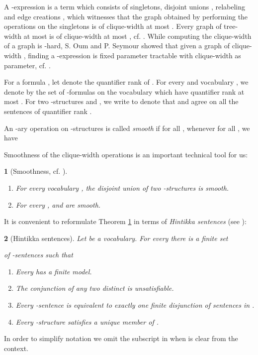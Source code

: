 \documentclass{llncs}
\newtheorem{thm}{\protect\theoremname}
\newtheorem{prop}[thm]{\protect\propositionname}
\providecommand{\propositionname}{Proposition}
\providecommand{\theoremname}{Theorem}
\begin{document}
A -expression is a term  which consists of singletons, disjoint unions , relabeling  and edge creations , which witnesses that the graph  obtained by performing the operations on the singletons is of clique-width at most . Every graph of tree-width at most  is of clique-width at most , cf. \cite{ar:CourcelleOlariu2000}. While computing the clique-width of a graph is -hard, S. Oum and P. Seymour showed that given a graph of clique-width , finding a -expression is fixed parameter tractable with clique-width as parameter, cf. \cite{ar:Oum2005,ar:SeymourOum2006}. 

For a formula , let  denote the quantifier
rank of . For every  and vocabulary ,
we denote by  the set of -formulas on the
vocabulary  which have quantifier rank at most . For two
-structures  and , we write 
to denote that  and  agree on all the
sentences of quantifier rank . 

\begin{definition}
 An -ary operation  on -structures is called {\em smooth} 
if for all , 
whenever   for all , 
we have  
\end{definition}

Smoothness
of the clique-width operations is an important technical tool for
us:
\begin{thm}
[Smoothness, cf. \cite{makowsky2004algorithmic}] \label{th:smooth}~
\begin{enumerate}
\item For every vocabulary , the disjoint union  of two
-structures is smooth. 
\item For every ,  and 
are smooth. 
\end{enumerate}
\end{thm}
It is convenient to reformulate Theorem \ref{th:smooth} in terms
of {\em Hintikka sentences} (see \cite{bk:EF2005}):
\begin{prop}
[Hintikka sentences] \label{prop:Hin}  Let  be a vocabulary.
For every  there is a finite set

 of -sentences such that
\begin{enumerate}
\item Every  has a finite model.
\item The conjunction  of any two distinct 
is unsatisfiable.
\item Every -sentence  is equivalent to exactly
one finite disjunction of sentences in .
\item Every -structure  satisfies a unique member 
of .
\end{enumerate}
\end{prop}
In order to simplify notation we omit the subscript  in  when  is clear from the context.
\end{document}
